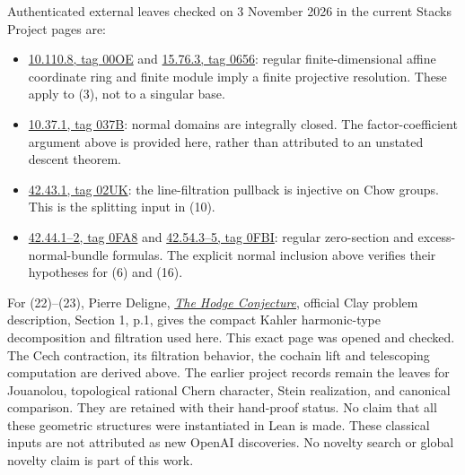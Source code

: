 \documentclass[11pt]{article}
\begin{document}
Authenticated external leaves checked on 3 November 2026 in the current
Stacks Project pages are:
\begin{itemize}
\item \href{https://stacks.math.columbia.edu/tag/00OE}{10.110.8, tag 00OE}
and \href{https://stacks.math.columbia.edu/tag/0656}{15.76.3, tag 0656}:
regular finite-dimensional affine coordinate ring and finite module imply
a finite projective resolution. These apply to (3), not to a singular base.
\item \href{https://stacks.math.columbia.edu/tag/037B}{10.37.1, tag 037B}:
normal domains are integrally closed. The factor-coefficient argument above
is provided here, rather than attributed to an unstated descent theorem.
\item \href{https://stacks.math.columbia.edu/tag/02UK}{42.43.1, tag 02UK}:
the line-filtration pullback is injective on Chow groups. This is the
splitting input in (10).
\item \href{https://stacks.math.columbia.edu/tag/0FA8}{42.44.1--2, tag 0FA8}
and \href{https://stacks.math.columbia.edu/tag/0FBI}{42.54.3--5, tag 0FBI}:
regular zero-section and excess-normal-bundle formulas. The explicit
normal inclusion above verifies their hypotheses for (6) and (16).
\end{itemize}
For (22)--(23), Pierre Deligne,
\href{https://www.claymath.org/wp-content/uploads/2022/06/hodge.pdf}{\emph{The Hodge Conjecture}},
official Clay problem description, Section 1, p.1, gives the compact
Kahler harmonic-type decomposition and filtration used here. This exact
page was opened and checked. The Cech contraction, its filtration behavior,
the cochain lift and telescoping computation are derived above.
The earlier project records remain the leaves for Jouanolou, topological
rational Chern character, Stein realization, and canonical comparison.
They are retained with their hand-proof status. No claim that all these
geometric structures were instantiated in Lean is made. These classical
inputs are not attributed as new OpenAI discoveries. No novelty search
or global novelty claim is part of this work.
\end{document}
